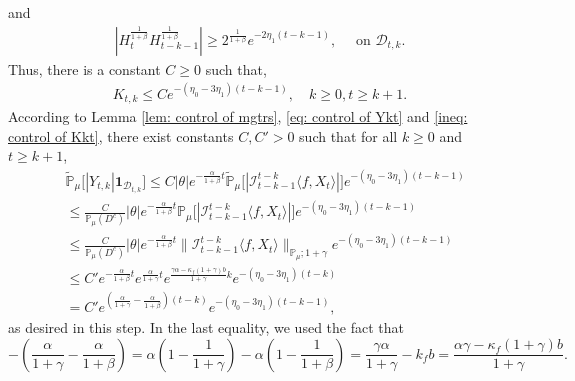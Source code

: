\documentclass[12pt,a4paper]{amsart}
\theoremstyle{plain}
\theoremstyle{definition}
\numberwithin{equation}{section}
\begin{document}
    and
\begin{align*}
    |H_t^{\frac{1}{1+\beta}}H_{t-k-1}^{\frac{1}{1+\beta}}|
    \geq 2^{\frac{1}{1+\beta}} e^{-2\eta_1(t-k-1)},
    \quad \text{ on } \mathcal D_{t,k}.
\end{align*}
    Thus, there is a constant $C\geq 0$ such that,
\begin{equation}\begin{split}
\label{ineq: control of Kkt}
     K_{t,k}
     \leq C e^{-(\eta_0 - 3\eta_1)(t-k-1)},
     \quad k \geq 0, t\geq k+1.
\end{split}\end{equation}
   According to Lemma \ref{lem: control of mgtrs}, \eqref{eq: control of Ykt} and  \eqref{ineq: control of Kkt}, 
    there exist constants $C,C'>0$ such that  for all $k\geq 0$ and $t\geq k+1$,
\begin{equation}\begin{split}
\label{eq: Y in D}
    &\mathbb{\tilde{P}}_{\mu}\big[|Y_{t,k}|\mathbf{1}_{\mathcal{D}_{t,k}}\big]
    \leq C|\theta|e^{-\frac{\alpha}{1+\beta}t}\mathbb{\tilde{P}}_{\mu}\big[|\mathcal{I}_{t-k-1}^{t-k}\langle f,X_t\rangle|\big]e^{-(\eta_0 - 3\eta_1)(t-k-1)}
    \\&\leq \frac{C}{\mathbb{P}_{\mu}(D^c)}|\theta|e^{-\frac{\alpha}{1+\beta}t}\mathbb{P}_{\mu}\big[|\mathcal{I}_{t-k-1}^{t-k}\langle f,X_t\rangle|\big]e^{-(\eta_0 - 3\eta_1)(t-k-1)}
    \\&\leq \frac{C}{\mathbb{P}_{\mu}(D^c)}|\theta|e^{-\frac{\alpha}{1+\beta}t}\|\mathcal{I}_{t-k-1}^{t-k}\langle f,X_t\rangle\|_{\mathbb P_\mu; 1+\gamma} e^{-(\eta_0 - 3\eta_1)(t-k - 1)}
    \\&\leq C' e^{-\frac{\alpha}{1+\beta}t}e^{\frac{\alpha}{1+\gamma}t}e^{\frac{\gamma \alpha-\kappa_f(1+\gamma)b}{1+\gamma}k}e^{-(\eta_0 - 3\eta_1)(t-k)}\\&= C' e^{(\frac{\alpha}{1+\gamma}-\frac{\alpha}{1+\beta})(t-k)}e^{-(\eta_0 - 3\eta_1)(t-k-1)},
\end{split}\end{equation}
    as desired in this step.
    In the last equality, we used the fact that
\[
    -(\frac{\alpha}{1+\gamma}-\frac{\alpha}{1+\beta})
    = \alpha(1-\frac{1}{1+\gamma}) - \alpha(1-\frac{1}{1+\beta})
    = \frac{\gamma \alpha}{1+\gamma} - k_f b
    =\frac{\alpha \gamma-\kappa_f(1+\gamma)b}{1+\gamma}.
\]
\end{document}
